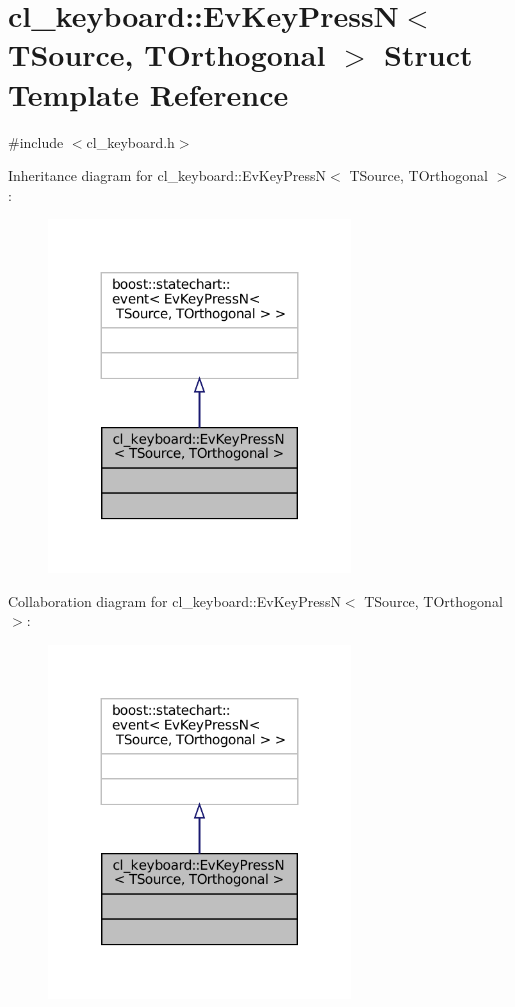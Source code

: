 \hypertarget{structcl__keyboard_1_1EvKeyPressN}{}\section{cl\+\_\+keyboard\+:\+:Ev\+Key\+PressN$<$ T\+Source, T\+Orthogonal $>$ Struct Template Reference}
\label{structcl__keyboard_1_1EvKeyPressN}


{\ttfamily \#include $<$cl\+\_\+keyboard.\+h$>$}



Inheritance diagram for cl\+\_\+keyboard\+:\+:Ev\+Key\+PressN$<$ T\+Source, T\+Orthogonal $>$\+:
\nopagebreak
\begin{figure}[H]
\begin{center}
\leavevmode
\includegraphics[width=227pt]{structcl__keyboard_1_1EvKeyPressN__inherit__graph}
\end{center}
\end{figure}


Collaboration diagram for cl\+\_\+keyboard\+:\+:Ev\+Key\+PressN$<$ T\+Source, T\+Orthogonal $>$\+:
\nopagebreak
\begin{figure}[H]
\begin{center}
\leavevmode
\includegraphics[width=227pt]{structcl__keyboard_1_1EvKeyPressN__coll__graph}
\end{center}
\end{figure}


